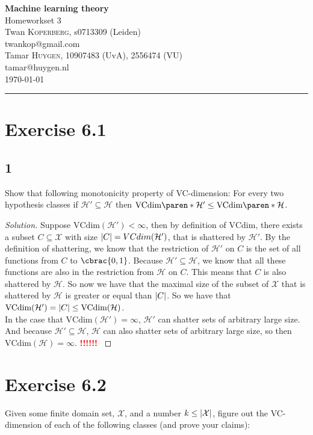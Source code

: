 \documentclass[10pt, a4paper, twoside]{amsart}
\makeatletter
\DeclarePairedDelimiter\abs{\lvert}{\rvert}
\DeclarePairedDelimiter\cbrac\{\}
\DeclarePairedDelimiter\paren()
\newcommand{\cH}{\ensuremath{\mathcal{H}}}
\newcommand{\cX}{\ensuremath{\mathcal{X}}}
\newenvironment{solution}
               {\let\oldqedsymbol=\qedsymbol
                \renewcommand{\qedsymbol}{$\blacktriangleleft$}
                \begin{proof}[Solution]}
               {\end{proof}
                \renewcommand{\qedsymbol}{\oldqedsymbol}}
\newcommand{\TODO}{\textcolor{red}{\textbf{!!!!!! }}}
\newcommand{\firstName}  {Twan}
\newcommand{\lastName}   {Koperberg}
\newcommand{\studId}     {0713309 (Leiden)}
\renewcommand{\email}    {twankop@gmail.com}
\newcommand{\firstNameII}  {Tamar}
\newcommand{\lastNameII}   {Huygen}
\newcommand{\studIdII}     {10907483 (UvA)}
\newcommand{\studIdIII}    {2556474 (VU)}
\newcommand{\emailII}     {tamar@huygen.nl}
\makeatother
\begin{document}
\begin{center}

  {\huge\bf Machine learning theory}\\
  {\large\sc Homeworkset 3 }\\ \vspace{1em}
  \firstName \textsc{ \lastName}, {\sc s}\studId \\
  \email\text{}\\ \smallskip
  \firstNameII \textsc{ \lastNameII}, \studIdII, \studIdIII\\
  \emailII \\ \bigskip
  \today \\\bigskip
  \hrule
  \bigskip
 \end{center}

\section*{Exercise 6.1}
\subsection*{1}
Show that following monotonicity property of VC-dimension: For every two hypothesis classes if $\cH' \subseteq \cH$ then $\text{VCdim}\paren*{\cH'}\leq \text{VCdim}\paren*{\cH}$.
\begin{solution}
  Suppose $\text{VCdim}(\cH') < \infty$, then by definition of $\text{VCdim}$, there exists a subset $C \subseteq \cX$ with size $\abs{C} = VCdim(\cH')$, that is shattered by $\cH'$. By the definition of shattering, we know that the restriction of $\cH'$ on $C$ is the set of all functions from $C$ to $\cbrac{0,1}$. Because $\cH' \subseteq \cH$, we know that all these functions are also in the restriction from $\cH$ on $C$. This means that $C$ is also shattered by $\cH$. So now we have that the maximal size of the subset of $\cX$ that is shattered by $\cH$ is greater or equal than $\abs{C}$. So we have that $\text{VCdim}(\cH') = \abs{C} \leq \text{VCdim}(\cH)$. \\
  In the case that $\text{VCdim}(\cH') = \infty$, $\cH'$ can shatter sets of arbitrary large size. And because $\cH' \subseteq \cH$, $\cH$ can also shatter sets of arbitrary large size, so then  $\text{VCdim}(\cH ) = \infty$.
 \TODO
\end{solution}
\section*{Exercise 6.2}
Given some finite domain set, $\cX$, and a number $k \leq \abs{\cX}$, figure out the VC-dimension of each of the following classes (and prove your claims):
\end{document}
